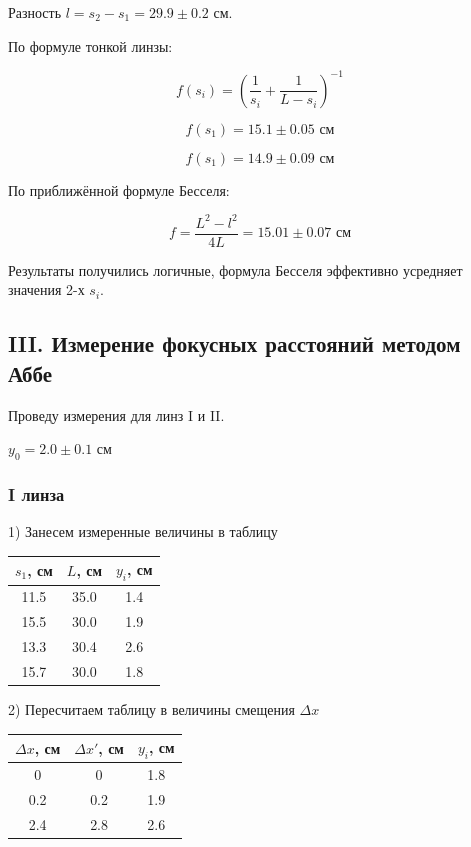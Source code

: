 \documentclass{astroedu-lab}
\begin{document}
\begin{problem}
Разность $l = s_2 - s_1 = 29.9 \pm 0.2$ см.

По формуле тонкой линзы:

\begin{equation}
	f(s_i) = \left( \frac{1}{s_i} + \frac{1}{L-s_i} \right) ^{-1}
\end{equation}

\begin{equation}
	f(s_1) = 15.1 \pm 0.05 \text{ см}
\end{equation}

\begin{equation}
	f(s_1) = 14.9 \pm 0.09 \text{ см}
\end{equation}

По приближённой формуле Бесселя:

\begin{equation}
	f = \frac{L^2 - l^2}{4 L} = 15.01 \pm 0.07 \text{ см}
\end{equation}

Результаты получились логичные, формула Бесселя эффективно усредняет значения 2-х $s_i$.

\subsection{III. Измерение фокусных расстояний методом Аббе}

Проведу измерения для линз I и II.

$y_0 = 2.0 \pm 0.1$ см

\subsubsection{I линза}

1) Занесем измеренные величины в таблицу

\begin{center}
\begin{tabular}{|c|c|c|}
\hline 
$s_1$, см & $L$, см & $y_i$, см \\
\hline
11.5 & 35.0 & 1.4 \\
15.5 & 30.0 & 1.9 \\
13.3 & 30.4 & 2.6 \\
15.7 & 30.0 & 1.8 \\
\hline
\end{tabular}
\end{center}

2) Пересчитаем таблицу в величины смещения $\Delta x$

\begin{center}
\begin{tabular}{|c|c|c|}
\hline 
$\Delta x$, см & $\Delta x'$, см & $y_i$, см \\
\hline
0 & 0 & 1.8 \\
0.2 & 0.2 & 1.9 \\
2.4 & 2.8 & 2.6 \\
\hline
\end{tabular}
\end{center}


\end{problem}
\end{document}
